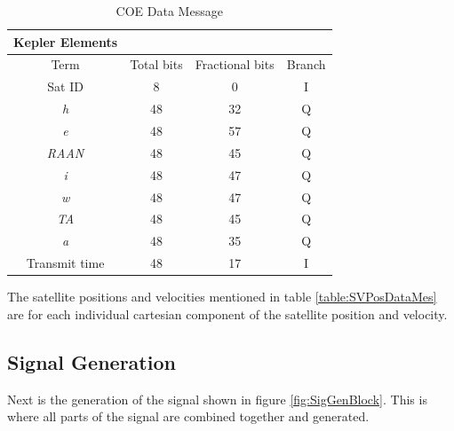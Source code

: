 \documentclass[12pt]{report}
\begin{document}
\begin{table}
    \begin{center}
        \begin{tabular}{|c|c|c|c|}
            \hline
            Kepler Elements \\
            \hline\hline
            Term & Total bits & Fractional bits & Branch \\
            \hline
            Sat ID & 8 & 0 & I \\
            \hline
            \textit{h} & 48 & 32 & Q \\
            \hline
            \textit{e} & 48 & 57 & Q \\
            \hline
            \textit{RAAN} & 48 & 45 & Q \\
            \hline
            \textit{i} & 48 & 47 & Q \\
            \hline
            \textit{w} & 48 & 47 & Q \\
            \hline
            \textit{TA} & 48 & 45 & Q \\
            \hline
            \textit{a} & 48 & 35 & Q \\
            \hline
            Transmit time & 48 & 17 & I \\
            \hline
        \end{tabular}
    \end{center}
    \caption{COE Data Message}
    \label{table:COEdatMes}
\end{table}
The satellite positions and velocities mentioned in table \ref{table:SVPosDataMes} are for each individual cartesian component of the satellite position and velocity.

\subsection{Signal Generation}
Next is the generation of the signal shown in figure \ref{fig:SigGenBlock}. This is where all parts of the signal are combined together and generated. 
\end{document}
